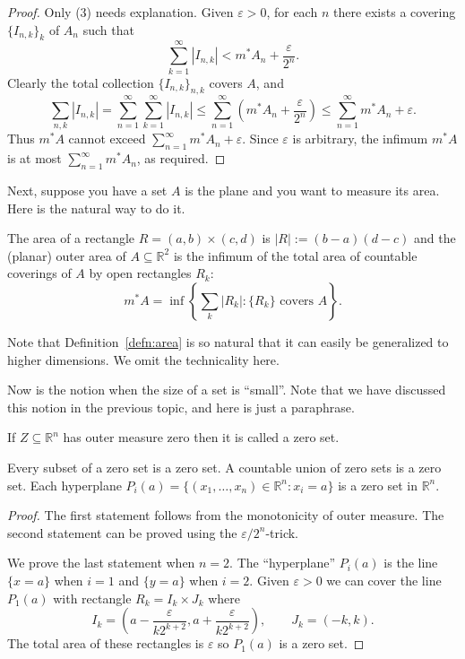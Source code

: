 \documentclass[11pt]{article}
\begin{document}
\begin{proof}
  Only (3) needs explanation.  Given $\varepsilon > 0$, for each $n$ there exists a covering $\{I_{n,k}\}_k$ of $A_n$ such that
  \[
    \sum_{k=1}^\infty |I_{n,k}| < m^*A_n + \frac{\varepsilon}{2^n}.
  \]
  Clearly the total collection $\{ I_{n,k} \}_{n,k}$ covers $A$, and
  \[
    \sum_{n,k} |I_{n,k}| = \sum_{n=1}^\infty \sum_{k=1}^\infty |I_{n,k}| \leqslant \sum_{n=1}^\infty \left( m^*A_n + \frac{\varepsilon}{2^n} \right) \leqslant \sum_{n=1}^\infty m^*A_n + \varepsilon.
  \]
  Thus $m^*A$ cannot exceed $\sum_{n=1}^\infty m^*A_n + \varepsilon$.  Since $\varepsilon$ is arbitrary, the infimum $m^*A$ is at most $\sum_{n=1}^\infty m^*A_n$, as required.
\end{proof}

Next, suppose you have a set $A$ is the plane and you want to measure its area.  Here is the natural way to do it.

\begin{defn}
  \label{defn:area}
  The \textsf{area} of a rectangle $R = (a,b) \times (c,d)$ is $|R| := (b-a)(d-c)$ and the (planar) outer area of $A \subseteq \mathbb{R}^2$ is the infimum of the total area of countable coverings of $A$ by open rectangles $R_k$:
  \[
    m^* A = \inf \left\{ \sum_k |R_k| \colon \{ R_k \} \text{ covers $A$} \right\}.
  \]
\end{defn}
Note that Definition~\ref{defn:area} is so natural that it can easily be generalized to higher dimensions.  We omit the technicality here.

Now is the notion when the size of a set is ``small''.  Note that we have discussed this notion in the previous topic, and here is just a paraphrase.

\begin{defn}
  If $Z \subseteq \mathbb{R}^n$ has outer measure zero then it is called a \textsf{zero set}.
\end{defn}

\begin{prop}
  Every subset of a zero set is a zero set.  A countable union of zero sets is a zero set.  Each hyperplane $P_i(a) = \{ (x_1, \dots, x_n) \in \mathbb{R}^n \colon x_i = a \}$ is a zero set in $\mathbb{R}^n$.
\end{prop}

\begin{proof}
  The first statement follows from the monotonicity of outer measure.  The second statement can be proved using the $\varepsilon/2^n$-trick.

  We prove the last statement when $n = 2$.  The ``hyperplane'' $P_i(a)$ is the line $\{ x = a \}$ when $i=1$ and $\{ y = a \}$ when $i=2$.  Given $\varepsilon > 0$ we can cover the line $P_1(a)$ with rectangle $R_k = I_k \times J_k$ where
  \[
    I_k = \left( a - \frac{\varepsilon}{k 2^{k+2}}, a + \frac{\varepsilon}{k 2^{k+2}} \right), \qquad J_k = (-k, k).
  \]
  The total area of these rectangles is $\varepsilon$ so $P_1(a)$ is a zero set.
\end{proof}
\end{document}
